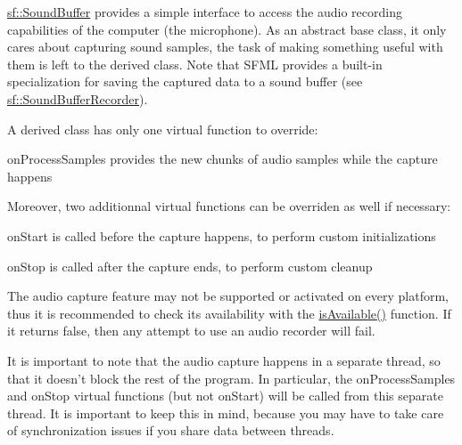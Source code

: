 \hyperlink{classsf_1_1_sound_buffer}{sf\+::\+Sound\+Buffer} provides a simple interface to access the audio recording capabilities of the computer (the microphone). As an abstract base class, it only cares about capturing sound samples, the task of making something useful with them is left to the derived class. Note that S\+F\+M\+L provides a built-\/in specialization for saving the captured data to a sound buffer (see \hyperlink{classsf_1_1_sound_buffer_recorder}{sf\+::\+Sound\+Buffer\+Recorder}).

A derived class has only one virtual function to override\+: \begin{DoxyItemize}
\item on\+Process\+Samples provides the new chunks of audio samples while the capture happens\end{DoxyItemize}
Moreover, two additionnal virtual functions can be overriden as well if necessary\+: \begin{DoxyItemize}
\item on\+Start is called before the capture happens, to perform custom initializations \item on\+Stop is called after the capture ends, to perform custom cleanup\end{DoxyItemize}
The audio capture feature may not be supported or activated on every platform, thus it is recommended to check its availability with the \hyperlink{classsf_1_1_sound_recorder_aab2bd0fee9e48d6cfd449b1cb078ce5a}{is\+Available()} function. If it returns false, then any attempt to use an audio recorder will fail.

It is important to note that the audio capture happens in a separate thread, so that it doesn't block the rest of the program. In particular, the on\+Process\+Samples and on\+Stop virtual functions (but not on\+Start) will be called from this separate thread. It is important to keep this in mind, because you may have to take care of synchronization issues if you share data between threads.

